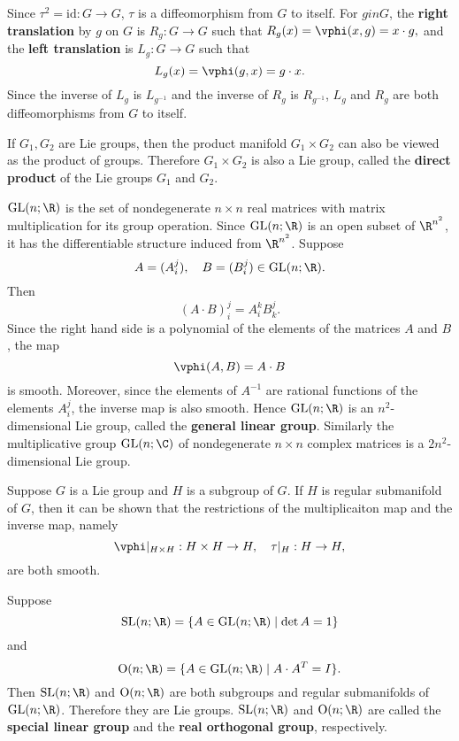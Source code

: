 \documentclass[11pt]{article}
\begin{document}
Since $\tau^2 = \text{id} : G \rightarrow G$, $\tau$ is a diffeomorphism from $G$ to itself. For $g in G$, the \textbf{right translation} by $g$ on $G$ is $R_g : G \rightarrow G$ such that $R_g(x) = \vphi(x, g) = x \cdot g,$ and the \textbf{left translation} is $L_g : G \rightarrow G$ such that $$L_g(x) = \vphi(g, x) = g \cdot x.$$ Since the inverse of $L_g$ is $L_{g^{-1}}$ and the inverse of $R_g$ is $R_{g^{-1}}$, $L_g$ and $R_g$ are both diffeomorphisms from $G$ to itself. 

If $G_1, G_2$ are Lie groups, then the product manifold $G_1 \times G_2$ can also be viewed as the product of groups. Therefore $G_1 \times G_2$ is also a Lie group, called the \textbf{direct product} of the Lie groups $G_1$ and $G_2$. 

\begin{example}
    $\GL(n; \R)$ is the set of nondegenerate $n \times n$ real matrices with matrix multiplication for its group operation. Since $\GL(n; \R)$ is an open subset of $\R^{n^2}$, it has the differentiable structure induced from $\R^{n^2}$. Suppose $$A = (A^j_i), \quad B = (B^j_i) \in \GL(n; \R).$$ Then $$(A \cdot B)^j_i = A^k_iB^j_k.$$ Since the right hand side is a polynomial of the elements of the matrices $A$ and $B$, the map $$\vphi(A, B) = A \cdot B$$ is smooth. Moreover, since the elements of $A^{-1}$ are rational functions of the elements $A^j_i$, the inverse map is also smooth. Hence $\GL(n; \R)$ is an $n^2$-dimensional Lie group, called the \textbf{general linear group}. Similarly the multiplicative group $\GL(n; \C)$ of nondegenerate $n \times n$ complex matrices is a $2n^2$-dimensional Lie group.
\end{example}

\begin{example}
    Suppose $G$ is a Lie group and $H$ is a subgroup of $G$. If $H$ is regular submanifold of $G$, then it can be shown that the restrictions of the multiplicaiton map and the inverse map, namely $$\vphi|_{H \times H} : H \times H \rightarrow H, \quad \tau|_H : H \rightarrow H,$$ are both smooth.

    Suppose $$\SL(n; \R) = \{A \in \GL(n; \R) \mid \det A = 1\}$$ and $$\O(n; \R) = \{A \in \GL(n; \R) \mid A \cdot A^T = I\}.$$ Then $\SL(n; \R)$ and $\O(n; \R)$ are both subgroups and regular submanifolds of $\GL(n; \R)$. Therefore they are Lie groups. $\SL(n; \R)$ and $\O(n; \R)$ are called the \textbf{special linear group} and the \textbf{real orthogonal group}, respectively.
\end{example}
\end{document}
